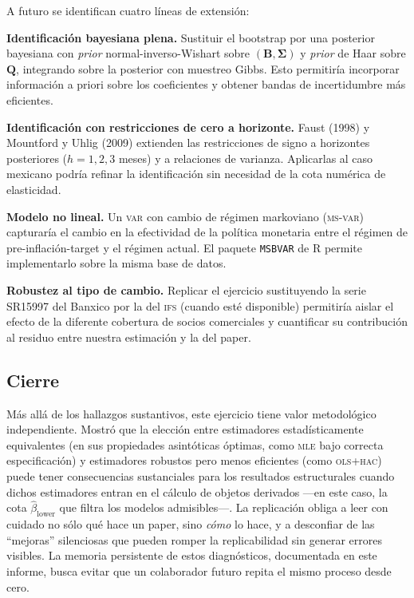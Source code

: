 \documentclass[11pt,letterpaper]{article}
\begin{document}
A futuro se identifican cuatro líneas de extensión:

\textbf{Identificación bayesiana plena.} Sustituir el bootstrap por una posterior bayesiana con \textit{prior} normal-inverso-Wishart sobre $(\bm{B}, \bm{\Sigma})$ y \textit{prior} de Haar sobre $\bm{Q}$, integrando sobre la posterior con muestreo Gibbs. Esto permitiría incorporar información a priori sobre los coeficientes y obtener bandas de incertidumbre más eficientes.

\textbf{Identificación con restricciones de cero a horizonte.} Faust (1998) y Mountford y Uhlig (2009) extienden las restricciones de signo a horizontes posteriores ($h=1, 2, 3$ meses) y a relaciones de varianza. Aplicarlas al caso mexicano podría refinar la identificación sin necesidad de la cota numérica de elasticidad.

\textbf{Modelo no lineal.} Un \textsc{var} con cambio de régimen markoviano (\textsc{ms-var}) capturaría el cambio en la efectividad de la política monetaria entre el régimen de pre-inflación-target y el régimen actual. El paquete \texttt{MSBVAR} de \textsf{R} permite implementarlo sobre la misma base de datos.

\textbf{Robustez al tipo de cambio.} Replicar el ejercicio sustituyendo la serie SR15997 del Banxico por la del \textsc{ifs} (cuando esté disponible) permitiría aislar el efecto de la diferente cobertura de socios comerciales y cuantificar su contribución al residuo entre nuestra estimación y la del paper.

\subsection{Cierre}

Más allá de los hallazgos sustantivos, este ejercicio tiene valor metodológico independiente. Mostró que la elección entre estimadores estadísticamente equivalentes (en sus propiedades asintóticas óptimas, como \textsc{mle} bajo correcta especificación) y estimadores robustos pero menos eficientes (como \textsc{ols}+\textsc{hac}) puede tener consecuencias sustanciales para los resultados estructurales cuando dichos estimadores entran en el cálculo de objetos derivados —en este caso, la cota $\hat\beta_{\text{lower}}$ que filtra los modelos admisibles—. La replicación obliga a leer con cuidado no sólo qué hace un paper, sino \textit{cómo} lo hace, y a desconfiar de las ``mejoras'' silenciosas que pueden romper la replicabilidad sin generar errores visibles. La memoria persistente de estos diagnósticos, documentada en este informe, busca evitar que un colaborador futuro repita el mismo proceso desde cero.
\end{document}
